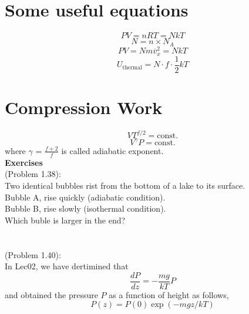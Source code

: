 
\section{Some useful equations} %
\begin{equation} \label{idealgas} PV = nRT = NkT \end{equation}
\begin{equation} \label{Avogadro} N = n \times N_A \end{equation}
\begin{equation} \label{PV-micro} PV = Nm{\overline v_x^2} = NkT \end{equation}
\begin{equation} \label{eqpartition} U_\text{thermal} = N \cdot f \cdot \frac{1}{2}kT \end{equation}

\section{Compression Work}

\begin{equation} \label{duw5} VT^{f/2} = \textrm{const}. \end{equation}
\begin{equation} \label{duw6} V^{\gamma}P = \textrm{const}. \end{equation}
where ${\gamma}$ = $\frac{f+2}{f}$ is called adiabatic exponent.\\

{\bf Exercises}\\
(Problem 1.38):\\
Two identical bubbles rist from the bottom of a lake to its surface.\\
Bubble A, rise quickly (adiabatic condition).\\
Bubble B, rise slowly (isothermal condition).\\
Which buble is larger in the end?
 \\\\\\

(Problem 1.40):\\
In Lec02, we have dertimined that 
  \begin{equation} \frac{dP}{dz} = -\frac{mg}{kT} P \end{equation}
and obtained the pressure $P$ as a function of height as follows,
  \begin{equation} P(z) = P(0) \exp(-mgz/kT) \end{equation}


